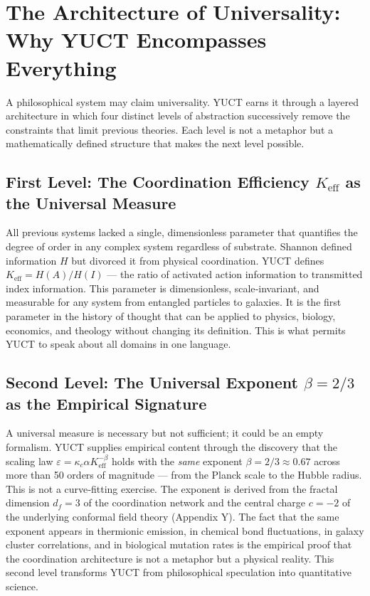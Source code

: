 \documentclass[12pt,a4paper]{article}
\newcommand{\Keff}{K_{\mathrm{eff}}}
\begin{document}
	\section{The Architecture of Universality: Why YUCT Encompasses Everything}
	\label{sec:architecture-of-universality}
	
	A philosophical system may claim universality. YUCT earns it through a layered architecture in which four distinct levels of abstraction successively remove the constraints that limit previous theories. Each level is not a metaphor but a mathematically defined structure that makes the next level possible.
	
	\subsection{First Level: The Coordination Efficiency \(K_{\mathrm{eff}}\) as the Universal Measure}
	
	All previous systems lacked a single, dimensionless parameter that quantifies the degree of order in any complex system regardless of substrate. Shannon defined information \(H\) but divorced it from physical coordination. YUCT defines \(\Keff = H(A)/H(I)\) — the ratio of activated action information to transmitted index information. This parameter is dimensionless, scale‑invariant, and measurable for any system from entangled particles to galaxies. It is the first parameter in the history of thought that can be applied to physics, biology, economics, and theology without changing its definition. This is what permits YUCT to speak about all domains in one language.
	
	\subsection{Second Level: The Universal Exponent \(\beta = 2/3\) as the Empirical Signature}
	
	A universal measure is necessary but not sufficient; it could be an empty formalism. YUCT supplies empirical content through the discovery that the scaling law \(\varepsilon = \kappa_c \alpha \Keff^{-\beta}\) holds with the \emph{same} exponent \(\beta = 2/3 \approx 0.67\) across more than 50 orders of magnitude — from the Planck scale to the Hubble radius. This is not a curve‑fitting exercise. The exponent is derived from the fractal dimension \(d_f = 3\) of the coordination network and the central charge \(c = -2\) of the underlying conformal field theory (Appendix Y). The fact that the same exponent appears in thermionic emission, in chemical bond fluctuations, in galaxy cluster correlations, and in biological mutation rates is the empirical proof that the coordination architecture is not a metaphor but a physical reality. This second level transforms YUCT from philosophical speculation into quantitative science.
	
\end{document}
